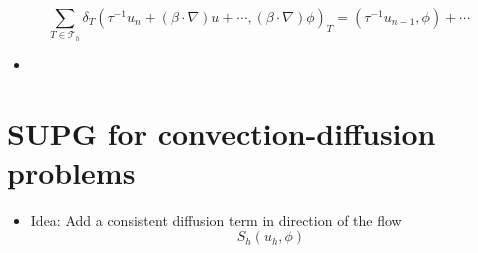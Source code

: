 \documentclass[openany,a4paper,11pt]{memoir}
\theoremstyle{definition}
\begin{document}
\[ \sum_{T\in \mathcal{T}_h}\delta_T(\tau^{-1}u_n+(\beta\cdot\nabla)u+\cdots,(\beta\cdot\nabla)\phi)_T = (\tau^{-1}u_{n-1},\phi)+\cdots \]

\begin{itemize}
\item 
\end{itemize}

\section{SUPG for convection-diffusion problems}

\begin{itemize}
\item Idea: Add a consistent diffusion term in direction of the flow \[ S_h(u_h,\phi)\]
\end{itemize}
\end{document}
